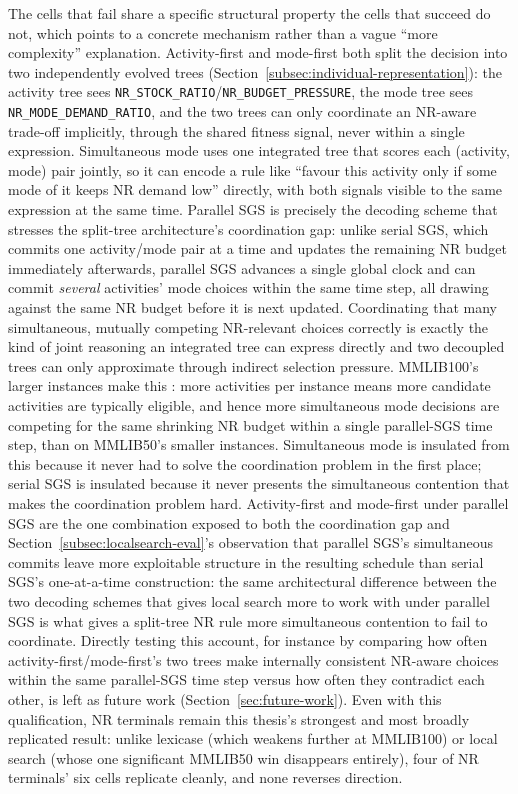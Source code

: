The cells that fail share a specific structural property the cells that
succeed do not, which points to a concrete mechanism rather than a vague
``more complexity'' explanation. Activity-first and mode-first both split
the decision into two independently evolved trees (Section~\ref{subsec:individual-representation}):
the activity tree sees \texttt{NR\_STOCK\_RATIO}/\texttt{NR\_BUDGET\_PRESSURE},
the mode tree sees \texttt{NR\_MODE\_DEMAND\_RATIO}, and the two trees can
only coordinate an NR-aware trade-off implicitly, through the shared
fitness signal, never within a single expression. Simultaneous mode uses
one integrated tree that scores each (activity, mode) pair jointly, so it
can encode a rule like ``favour this activity only if some mode of it
keeps NR demand low'' directly, with both signals visible to the same
expression at the same time. Parallel SGS is precisely the decoding scheme
that stresses the split-tree architecture's coordination gap: unlike serial
SGS, which commits one activity/mode pair at a time and updates the
remaining NR budget immediately afterwards, parallel SGS advances a single
global clock and can commit \emph{several} activities' mode choices within
the same time step, all drawing against the same NR budget before it is
next updated. Coordinating that many simultaneous, mutually competing
NR-relevant choices correctly is exactly the kind of joint reasoning an
integrated tree can express directly and two decoupled trees can only
approximate through indirect selection pressure. MMLIB100's larger
instances make this :
more activities per instance means more candidate activities are typically
eligible, and hence more simultaneous mode decisions are competing for the
same shrinking NR budget within a single parallel-SGS time step, than on
MMLIB50's smaller instances. Simultaneous mode is insulated from this
because it never had to solve the coordination problem in the first place;
serial SGS is insulated because it never presents the simultaneous
contention that makes the coordination problem hard. Activity-first and
mode-first under parallel SGS are the one combination exposed to both the
coordination gap and  Section~\ref{subsec:localsearch-eval}'s
observation that parallel SGS's simultaneous commits leave more exploitable
structure in the resulting schedule than serial SGS's one-at-a-time
construction: the same architectural difference between the two decoding
schemes that gives local search more to work with under parallel SGS is
what gives a split-tree NR rule more simultaneous contention to fail to
coordinate. Directly testing this account, for instance by comparing how
often activity-first/mode-first's two trees make internally consistent
NR-aware choices within the same parallel-SGS time step versus how often
they contradict each other, is left as future work
(Section~\ref{sec:future-work}). Even with this qualification, NR terminals
remain this thesis's strongest and most broadly replicated result: unlike
lexicase (which weakens further at MMLIB100) or local search (whose one
significant MMLIB50 win disappears entirely), four of NR terminals' six
cells replicate cleanly, and none reverses direction.


